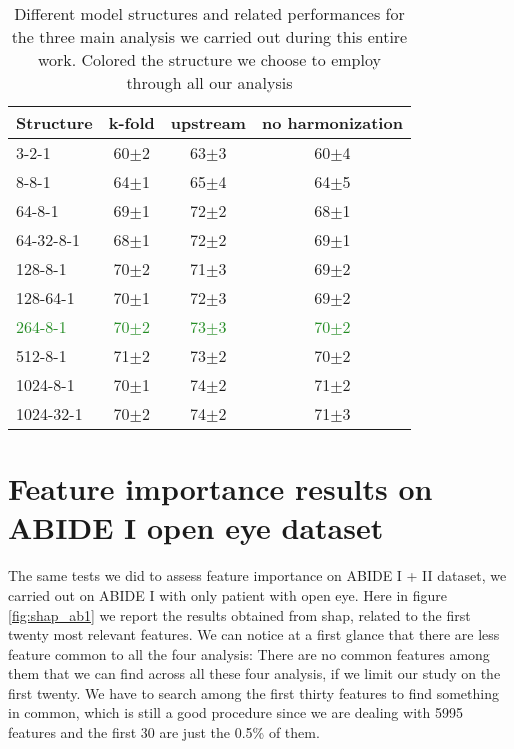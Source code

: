 \documentclass[11pt]{report}
\begin{document}
\begin{table}[!htp]\centering
\begin{tabular}{lccc}
\toprule
Structure &k-fold &upstream &no harmonization \\
\midrule
3-2-1 &60$\pm$2 &63$\pm$3 &60$\pm$4 \\
8-8-1 &64$\pm$1 &65$\pm$4 &64$\pm$5 \\
64-8-1 &69$\pm$1 &72$\pm$2 &68$\pm$1 \\
64-32-8-1 &68$\pm$1 &72$\pm$2 &69$\pm$1 \\
128-8-1 &70$\pm$2 &71$\pm$3 &69$\pm$2 \\
128-64-1 &70$\pm$1 &72$\pm$3 &69$\pm$2 \\
\textcolor{ForestGreen}{264-8-1}&\textcolor{ForestGreen}{70$\pm$2} & \textcolor{ForestGreen}{73$\pm$3} & \textcolor{ForestGreen}{70$\pm$2} \\
512-8-1 &71$\pm$2 &73$\pm$2 &70$\pm$2 \\
1024-8-1 &70$\pm$1 &74$\pm$2 &71$\pm$2 \\
1024-32-1 &70$\pm$2 &74$\pm$2 &71$\pm$3 \\
\bottomrule
\end{tabular}
\caption{Different model structures and related performances for the three main analysis we carried out during this entire work. Colored the structure we choose to employ through all our analysis}\label{tab:different_model_structures}
\end{table}

\section{Feature importance results on ABIDE I open eye dataset}

The same tests we did to assess feature importance on ABIDE I + II dataset, we carried out on ABIDE I with only patient with open eye.
Here in figure \ref{fig:shap_ab1} we report the results obtained from shap, related to the first twenty most relevant features.
We can notice at a first glance that there are less feature common to all the four analysis:
There are no common features among them that we can find across all these four analysis, if we limit our study on the first twenty.
We have to search among the first thirty features to find something in common, which is still a good procedure since we are dealing with 5995 features and the first 30 are just the 0.5\% of them.
\end{document}
